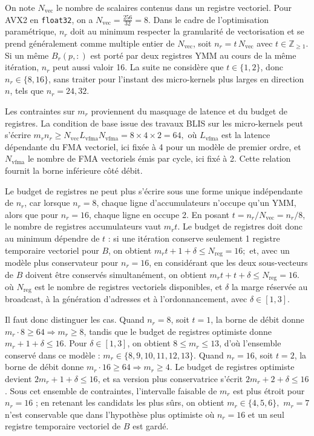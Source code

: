 \documentclass[a4paper,11pt,oneside]{article}
\begin{document}
On note $N_{\text{vec}}$ le nombre de scalaires contenus dans un registre vectoriel. Pour AVX2 en \texttt{float32}, on a
$
N_{\text{vec}} = \frac{256}{32} = 8.
$
Dans le cadre de l'optimisation paramétrique, $n_r$ doit au minimum respecter la granularité de vectorisation et se prend généralement comme multiple entier de $N_{\text{vec}}$, soit $n_r = t\,N_{\text{vec}}$ avec $t \in \mathbb{Z}_{\ge 1}$. Si un même $B_r(p,:)$ est porté par deux registres YMM au cours de la même itération, $n_r$ peut aussi valoir 16. La suite ne considère que $t \in \{1,2\}$, donc $n_r \in \{8,16\}$, sans traiter pour l'instant des micro-kernels plus larges en direction $n$, tels que $n_r = 24,32$.

Les contraintes sur $m_r$ proviennent du masquage de latence et du budget de registres. La condition de base issue des travaux BLIS sur les micro-kernels peut s'écrire
$
m_r n_r \ge N_{\text{vec}} L_{\text{vfma}} N_{\text{vfma}} = 8 \times 4 \times 2 = 64,
$
où $L_{\text{vfma}}$ est la latence dépendante du FMA vectoriel, ici fixée à 4 pour un modèle de premier ordre, et $N_{\text{vfma}}$ le nombre de FMA vectoriels émis par cycle, ici fixé à 2. Cette relation fournit la borne inférieure côté débit.

Le budget de registres ne peut plus s'écrire sous une forme unique indépendante de $n_r$, car lorsque $n_r = 8$, chaque ligne d'accumulateurs n'occupe qu'un YMM, alors que pour $n_r = 16$, chaque ligne en occupe 2. En posant $t = n_r / N_{\text{vec}} = n_r / 8$, le nombre de registres accumulateurs vaut $m_r t$. Le budget de registres doit donc au minimum dépendre de $t$ : si une itération conserve seulement 1 registre temporaire vectoriel pour $B$, on obtient
$
m_r t + 1 + \delta \le N_{\text{reg}} = 16;
$
et, avec un modèle plus conservateur pour $n_r = 16$, en considérant que les deux sous-vecteurs de $B$ doivent être conservés simultanément, on obtient
$
m_r t + t + \delta \le N_{\text{reg}} = 16.
$
où $N_{\text{reg}}$ est le nombre de registres vectoriels disponibles, et $\delta$ la marge réservée au broadcast, à la génération d'adresses et à l'ordonnancement, avec $\delta \in [1,3]$.

Il faut donc distinguer les cas. Quand $n_r = 8$, soit $t = 1$, la borne de débit donne $m_r \cdot 8 \ge 64 \Rightarrow m_r \ge 8$, tandis que le budget de registres optimiste donne $m_r + 1 + \delta \le 16$. Pour $\delta \in [1,3]$, on obtient $8 \le m_r \le 13$, d'où l'ensemble conservé dans ce modèle :
$
m_r \in \{8,9,10,11,12,13\}.
$
Quand $n_r = 16$, soit $t = 2$, la borne de débit donne $m_r \cdot 16 \ge 64 \Rightarrow m_r \ge 4$. Le budget de registres optimiste devient $2m_r + 1 + \delta \le 16$, et sa version plus conservatrice s'écrit $2m_r + 2 + \delta \le 16$. Sous cet ensemble de contraintes, l'intervalle faisable de $m_r$ est plus étroit pour $n_r = 16$ ; en retenant les candidats les plus sûrs, on obtient
$
m_r \in \{4,5,6\},
$
$m_r = 7$ n'est conservable que dans l'hypothèse plus optimiste où $n_r = 16$ et un seul registre temporaire vectoriel de $B$ est gardé.
\end{document}
